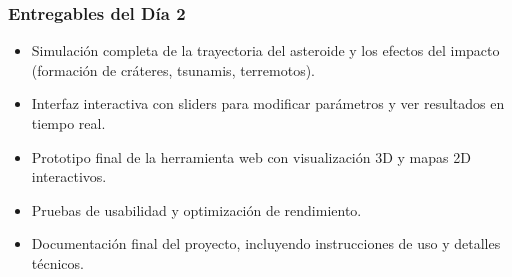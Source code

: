 \documentclass[conference]{IEEEtran}
\begin{document}
\subsubsection*{Entregables del Día 2}
\begin{itemize}
	\item Simulación completa de la trayectoria del asteroide y los efectos del
	      impacto (formación de cráteres, tsunamis, terremotos).
	\item Interfaz interactiva con sliders para modificar parámetros y ver
	      resultados en tiempo real.
	\item Prototipo final de la herramienta web con visualización 3D y mapas 2D interactivos.
	\item Pruebas de usabilidad y optimización de rendimiento.
	\item Documentación final del proyecto, incluyendo instrucciones de uso y detalles técnicos.
\end{itemize}
\end{document}
